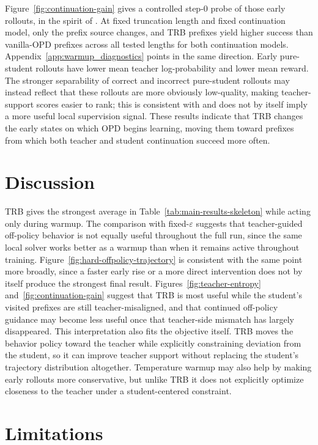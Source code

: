 \documentclass{llmxive}
\begin{document}
Figure~\ref{fig:continuation-gain} gives a controlled step-0 probe of those early rollouts, in the spirit of \citet{li2026rethinking}.
At fixed truncation length and fixed continuation model, only the prefix source changes, and TRB prefixes yield higher success than vanilla-OPD prefixes across all tested lengths for both continuation models.
Appendix~\ref{app:warmup_diagnostics} points in the same direction. Early pure-student rollouts have lower mean teacher log-probability and lower mean reward.
The stronger separability of correct and incorrect pure-student rollouts may instead reflect that these rollouts are more obviously low-quality, making teacher-support scores easier to rank; this is consistent with \citet{li2026rethinking} and does not by itself imply a more useful local supervision signal.
These results indicate that TRB changes the early states on which OPD begins learning, moving them toward prefixes from which both teacher and student continuation succeed more often.

\section{Discussion}

TRB gives the strongest average in Table~\ref{tab:main-results-skeleton} while acting only during warmup.
The comparison with fixed-$\varepsilon$ suggests that teacher-guided off-policy behavior is not equally useful throughout the full run, since the same local solver works better as a warmup than when it remains active throughout training.
Figure~\ref{fig:hard-offpolicy-trajectory} is consistent with the same point more broadly, since a faster early rise or a more direct intervention does not by itself produce the strongest final result.
Figures~\ref{fig:teacher-entropy} and~\ref{fig:continuation-gain} suggest that TRB is most useful while the student's visited prefixes are still teacher-misaligned, and that continued off-policy guidance may become less useful once that teacher-side mismatch has largely disappeared.
This interpretation also fits the objective itself. TRB moves the behavior policy toward the teacher while explicitly constraining deviation from the student, so it can improve teacher support without replacing the student's trajectory distribution altogether.
Temperature warmup may also help by making early rollouts more conservative, but unlike TRB it does not explicitly optimize closeness to the teacher under a student-centered constraint.

\section{Limitations}
\end{document}
